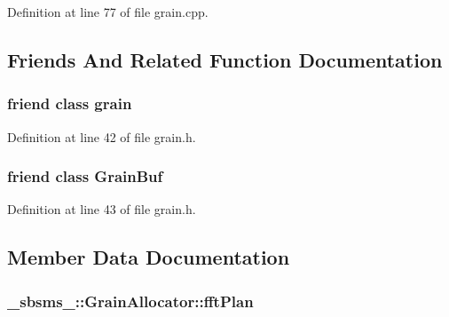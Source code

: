 Definition at line 77 of file grain.\+cpp.



\subsection{Friends And Related Function Documentation}
\subsubsection[{\texorpdfstring{grain}{grain}}]{\setlength{\rightskip}{0pt plus 5cm}friend class {\bf grain}\hspace{0.3cm}{\ttfamily [friend]}}\hypertarget{class__sbsms___1_1_grain_allocator_a778c621f37b03d2d17b2eda14d1a069e}{}\label{class__sbsms___1_1_grain_allocator_a778c621f37b03d2d17b2eda14d1a069e}


Definition at line 42 of file grain.\+h.

\subsubsection[{\texorpdfstring{Grain\+Buf}{GrainBuf}}]{\setlength{\rightskip}{0pt plus 5cm}friend class {\bf Grain\+Buf}\hspace{0.3cm}{\ttfamily [friend]}}\hypertarget{class__sbsms___1_1_grain_allocator_a79aef3eced47adf79a3580bb9a53c4e3}{}\label{class__sbsms___1_1_grain_allocator_a79aef3eced47adf79a3580bb9a53c4e3}


Definition at line 43 of file grain.\+h.



\subsection{Member Data Documentation}
\subsubsection[{\texorpdfstring{fft\+Plan}{fftPlan}}]{ \+\_\+sbsms\+\_\+\+::\+Grain\+Allocator\+::fft\+Plan\hspace{0.3cm}{\ttfamily [protected]}}\hypertarget{class__sbsms___1_1_grain_allocator_aa36f193e1597b68dae168f53aa0e24b5}{}\label{class__sbsms___1_1_grain_allocator_aa36f193e1597b68dae168f53aa0e24b5}


